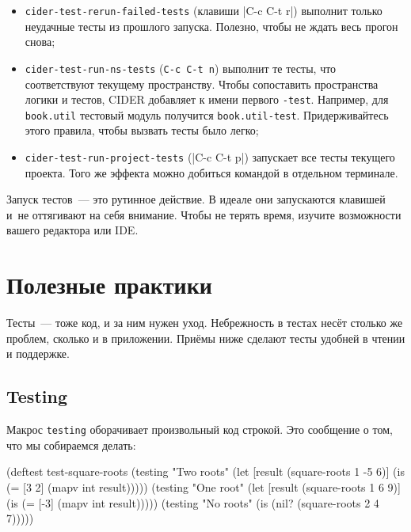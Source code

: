 \begin{itemize}

\item
  \verb|cider-test-rerun-failed-tests| (клавиши \spverb|C-c C-t r|) выполнит
  только неудачные тесты из прошлого запуска. Полезно, чтобы не ждать весь
  прогон снова;

\item
  \verb|cider-test-run-ns-tests| (\verb|C-c C-t n|) выполнит те тесты, что
  соответствуют текущему пространству. Чтобы сопоставить пространства логики и
  тестов, CIDER добавляет к имени первого \verb|-test|. Например, для
  \verb|book.util| тестовый модуль получится
  \verb|book.util-test|. Придерживайтесь этого правила, чтобы вызвать тесты было
  легко;

\item
  \verb|cider-test-run-project-tests| (\spverb|C-c C-t p|) запускает все тесты
  текущего проекта. Того же эффекта можно добиться командой  в
  отдельном терминале.

\end{itemize}

Запуск тестов~--- это рутинное действие. В идеале они запускаются клавишей и~не
оттягивают на себя внимание. Чтобы не терять время, изучите возможности вашего
редактора или IDE.

\section{Полезные практики}

Тесты~--- тоже код, и за ним нужен уход. Небрежность в тестах несёт столько же
проблем, сколько и в приложении. Приёмы ниже сделают тесты удобней в чтении и
поддержке.

\subsection{Testing}


Макрос \verb|testing| оборачивает произвольный код строкой. Это сообщение о том,
что мы собираемся делать:

\begin{english}
  \begin{clojure}
(deftest test-square-roots
  (testing "Two roots"
    (let [result (square-roots 1 -5 6)]
      (is (= [3 2] (mapv int result)))))
  (testing "One root"
    (let [result (square-roots 1 6 9)]
      (is (= [-3] (mapv int result)))))
  (testing "No roots"
    (is (nil? (square-roots 2 4 7)))))
  \end{clojure}
\end{english}

